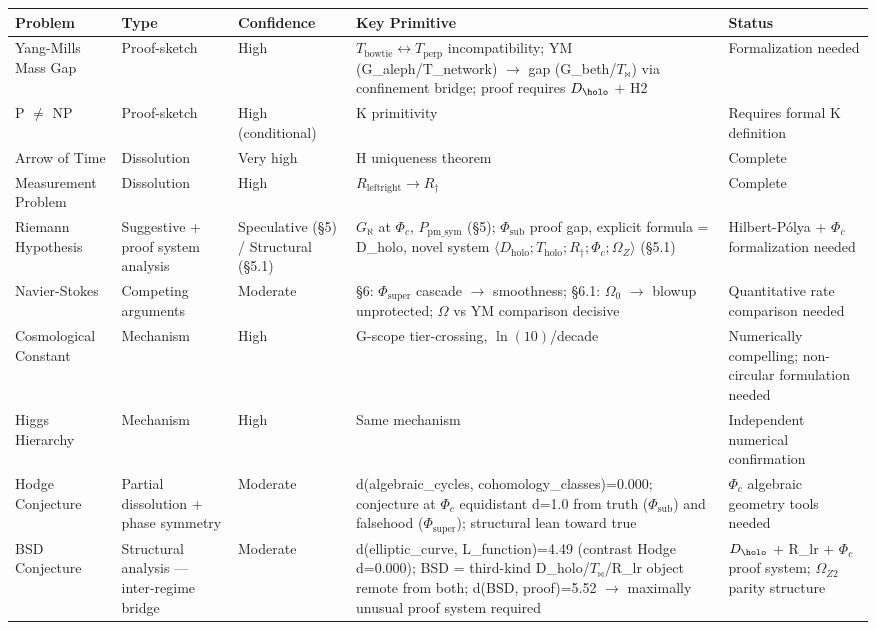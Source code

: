 \documentclass[12pt,a4paper]{article}
\newcommand{\pilcrow}{\S}
\begin{document}
\begin{table}[htbp]
\centering
\small
{}
\begin{tabularx}{\textwidth}{>{\centering\arraybackslash}X >{\centering\arraybackslash}X >{\centering\arraybackslash}X >{\centering\arraybackslash}X >{\centering\arraybackslash}X}
\toprule
\rowcolor{gray!25}\textbf{Problem} & \textbf{Type} & \textbf{Confidence} & \textbf{Key Primitive} & \textbf{Status} \\
\midrule
\rowcolors{1}{white}{gray!10}
Yang-Mills Mass Gap & Proof-sketch & High & $T_{\text{bowtie}} \leftrightarrow T_{\text{perp}}$ incompatibility; YM (G\_aleph/T\_network) $\to$ gap (G\_beth/$T_{\bowtie}$) via confinement bridge; proof requires $D_{\holo}$ + H2 & Formalization needed \\
P $\neq$ NP & Proof-sketch & High (conditional) & K primitivity & Requires formal K definition \\
Arrow of Time & Dissolution & Very high & H uniqueness theorem & Complete \\
Measurement Problem & Dissolution & High & $R_{\text{leftright}} \to R_{\dagger}$ & Complete \\
Riemann Hypothesis & Suggestive + proof system analysis & Speculative (\pilcrow{}5) / Structural (\pilcrow{}5.1) & $G_{\aleph}$ at $\Phi_c$, $P_{\text{pm\_sym}}$ (\pilcrow{}5); $\Phi_{\text{sub}}$ proof gap, explicit formula = D\_holo, novel system $\langle D_{\text{holo}};T_{\text{holo}};R_{\dagger};\Phi_c;\Omega_Z\rangle$ (\pilcrow{}5.1) & Hilbert-Pólya + $\Phi_c$ formalization needed \\
Navier-Stokes & Competing arguments & Moderate & \pilcrow{}6: $\Phi_{\text{super}}$ cascade $\to$ smoothness; \pilcrow{}6.1: $\Omega_0$ $\to$ blowup unprotected; $\Omega$ vs YM comparison decisive & Quantitative rate comparison needed \\
Cosmological Constant & Mechanism & High & G-scope tier-crossing, $\ln(10)$/decade & Numerically compelling; non-circular formulation needed \\
Higgs Hierarchy & Mechanism & High & Same mechanism & Independent numerical confirmation \\
Hodge Conjecture & Partial dissolution + phase symmetry & Moderate & d(algebraic\_cycles, cohomology\_classes)=0.000; conjecture at $\Phi_c$ equidistant d=1.0 from truth ($\Phi_{\text{sub}}$) and falsehood ($\Phi_{\text{super}}$); structural lean toward true & $\Phi_c$ algebraic geometry tools needed \\
BSD Conjecture & Structural analysis --- inter-regime bridge & Moderate & d(elliptic\_curve, L\_function)=4.49 (contrast Hodge d=0.000); BSD = third-kind D\_holo/$T_{\bowtie}$/R\_lr object remote from both; d(BSD, proof)=5.52 $\to$ maximally unusual proof system required & $D_{\holo}$ + R\_lr + $\Phi_c$ proof system; $\Omega_{Z2}$ parity structure \\
\bottomrule
\end{tabularx}
\end{table}
\end{document}
